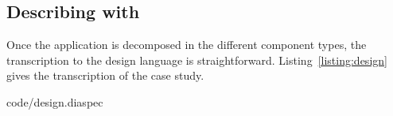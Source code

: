 \subsection{Describing with \diaspec{}}

Once the application is decomposed in the different component types,
the transcription to the \diaspec{} design language is
straightforward. Listing~\ref{listing:design} gives the transcription
of the case study.

%
{code/design.diaspec}

